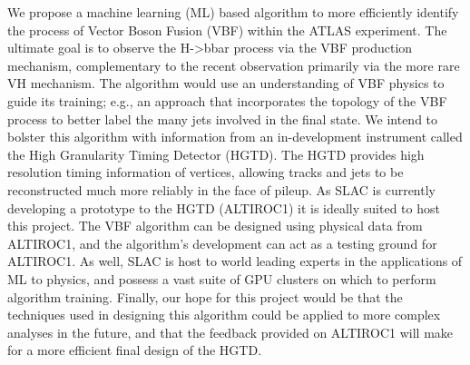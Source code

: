 \documentclass[paper=a4,fontsize=12pt]{article}
\begin{document}
We propose a machine learning (ML) based algorithm to more efficiently identify the process of Vector Boson Fusion (VBF) within the ATLAS experiment. The ultimate goal is to observe the H->bbar process via the VBF production mechanism, complementary to the recent observation primarily via the more rare VH mechanism. The algorithm would use an understanding of VBF physics to guide its training; e.g., an approach that incorporates the topology of the VBF process to better label the many jets involved in the final state. We intend to bolster this algorithm with information from an in-development instrument called the High Granularity Timing Detector (HGTD). The HGTD provides high resolution timing information of vertices, allowing tracks and jets to be reconstructed much more reliably in the face of pileup. As SLAC is currently developing a prototype to the HGTD (ALTIROC1) it is ideally suited to host this project. The VBF algorithm can be designed using physical data from ALTIROC1, and the algorithm's development can act as a testing ground for ALTIROC1. As well, SLAC is host to world leading experts in the applications of ML to physics, and possess a vast suite of GPU clusters on which to perform algorithm training. Finally, our hope for this project would be that the techniques used in designing this algorithm could be applied to more complex analyses in the future, and that the feedback provided on ALTIROC1 will make for a more efficient final design of the HGTD.
\end{document}
